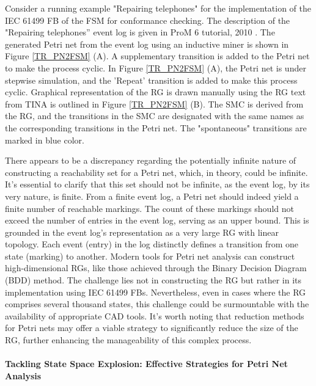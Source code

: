 \documentclass{ieeeojies}
\begin{document}
Consider a running example "Repairing telephones" for the implementation of the IEC 61499 FB of the FSM for conformance checking. The description of the "Repairing telephones'' event log is given in ProM 6 tutorial, 2010 \cite{prom6tutorial}. The generated Petri net from the event log using an inductive miner is shown in Figure \ref{TR_PN2FSM} (A). A supplementary transition is added to the Petri net to make the process cyclic. In Figure \ref{TR_PN2FSM} (A), the Petri net is under stepwise simulation, and the 'Repeat' transition is added to make this process cyclic. Graphical representation of the RG is drawn manually using the RG text from TINA is outlined in Figure \ref{TR_PN2FSM} (B). The SMC is derived from the RG, and the transitions in the SMC are designated with the same names as the corresponding transitions in the Petri net. The "spontaneous" transitions are marked in blue color.


There appears to be a discrepancy regarding the potentially infinite nature of constructing a reachability set for a Petri net, which, in theory, could be infinite. It's essential to clarify that this set should not be infinite, as the event log, by its very nature, is finite. From a finite event log, a Petri net should indeed yield a finite number of reachable markings. The count of these markings should not exceed the number of entries in the event log, serving as an upper bound. This is grounded in the event log's representation as a very large RG with linear topology. Each event (entry) in the log distinctly defines a transition from one state (marking) to another. Modern tools for Petri net analysis can construct high-dimensional RGs, like those achieved through the Binary Decision Diagram (BDD) method. The challenge lies not in constructing the RG but rather in its implementation using IEC 61499 FBs. Nevertheless, even in cases where the RG comprises several thousand states, this challenge could be surmountable with the availability of appropriate CAD tools. It's worth noting that reduction methods for Petri nets may offer a viable strategy to significantly reduce the size of the RG, further enhancing the manageability of this complex process.

\paragraph{Tackling State Space Explosion: Effective Strategies for Petri Net Analysis}
\end{document}
